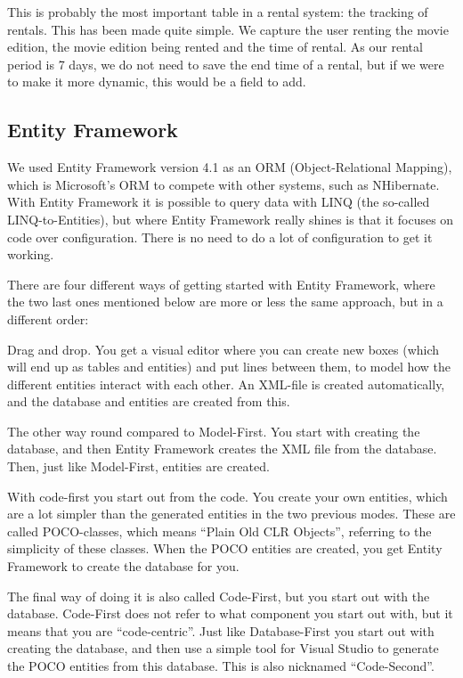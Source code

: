 This is probably the most important table in a rental system: the tracking of rentals. This has been made quite simple. We capture the user renting the movie edition, the movie edition being rented and the time of rental. As our rental period is 7 days, we do not need to save the end time of a rental, but if we were to make it more dynamic, this would be a field to add.

\subsection{Entity Framework}
\label{Design_Database_EntityFramework}

We used Entity Framework version 4.1 as an ORM (Object-Relational Mapping), which is Microsoft's ORM to compete with other systems, such as NHibernate. With Entity Framework it is possible to query data with LINQ (the so-called LINQ-to-Entities), but where Entity Framework really shines is that it focuses on code over configuration. There is no need to do a lot of configuration to get it working.

There are four different ways of getting started with Entity Framework, where the two last ones mentioned below are more or less the same approach, but in a different order:

\begin{my_description}
\item[Model-First] Drag and drop. You get a visual editor where you can create new boxes (which will end up as tables and entities) and put lines between them, to model how the different entities interact with each other. An XML-file is created automatically, and the database and entities are created from this.
\item[Database-First] The other way round compared to Model-First. You start with creating the database, and then Entity Framework creates the XML file from the database. Then, just like Model-First, entities are created.
\item[Code-First I] With code-first you start out from the code. You create your own entities, which are a lot simpler than the generated entities in the two previous modes. These are called POCO-classes, which means ``Plain Old CLR Objects'', referring to the simplicity of these classes. When the POCO entities are created, you get Entity Framework to create the database for you.
\item[Code-First II] The final way of doing it is also called Code-First, but you start out with the database. Code-First does not refer to what component you start out with, but it means that you are ``code-centric''. Just like Database-First you start out with creating the database, and then use a simple tool for Visual Studio to generate the POCO entities from this database. This is also nicknamed ``Code-Second''.
\end{my_description}

